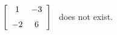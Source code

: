 {$\left[ \begin {array}{cc} 1&-3\\\noalign{\medskip}-2&6\end {array}
 \right] $
 }
{\ttai\ does not exist.}
